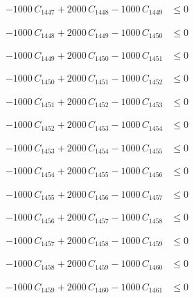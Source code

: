 \documentclass[a4paper,11pt]{article}
\begin{document}
\begin{align}
-1000\,C_{1447} + 2000\,C_{1448} - 1000\,C_{1449} &\leq 0 \nonumber
\end{align}

\begin{align}
-1000\,C_{1448} + 2000\,C_{1449} - 1000\,C_{1450} &\leq 0 \nonumber
\end{align}

\begin{align}
-1000\,C_{1449} + 2000\,C_{1450} - 1000\,C_{1451} &\leq 0 \nonumber
\end{align}

\begin{align}
-1000\,C_{1450} + 2000\,C_{1451} - 1000\,C_{1452} &\leq 0 \nonumber
\end{align}

\begin{align}
-1000\,C_{1451} + 2000\,C_{1452} - 1000\,C_{1453} &\leq 0 \nonumber
\end{align}

\begin{align}
-1000\,C_{1452} + 2000\,C_{1453} - 1000\,C_{1454} &\leq 0 \nonumber
\end{align}

\begin{align}
-1000\,C_{1453} + 2000\,C_{1454} - 1000\,C_{1455} &\leq 0 \nonumber
\end{align}

\begin{align}
-1000\,C_{1454} + 2000\,C_{1455} - 1000\,C_{1456} &\leq 0 \nonumber
\end{align}

\begin{align}
-1000\,C_{1455} + 2000\,C_{1456} - 1000\,C_{1457} &\leq 0 \nonumber
\end{align}

\begin{align}
-1000\,C_{1456} + 2000\,C_{1457} - 1000\,C_{1458} &\leq 0 \nonumber
\end{align}

\begin{align}
-1000\,C_{1457} + 2000\,C_{1458} - 1000\,C_{1459} &\leq 0 \nonumber
\end{align}

\begin{align}
-1000\,C_{1458} + 2000\,C_{1459} - 1000\,C_{1460} &\leq 0 \nonumber
\end{align}

\begin{align}
-1000\,C_{1459} + 2000\,C_{1460} - 1000\,C_{1461} &\leq 0 \nonumber
\end{align}
\end{document}
